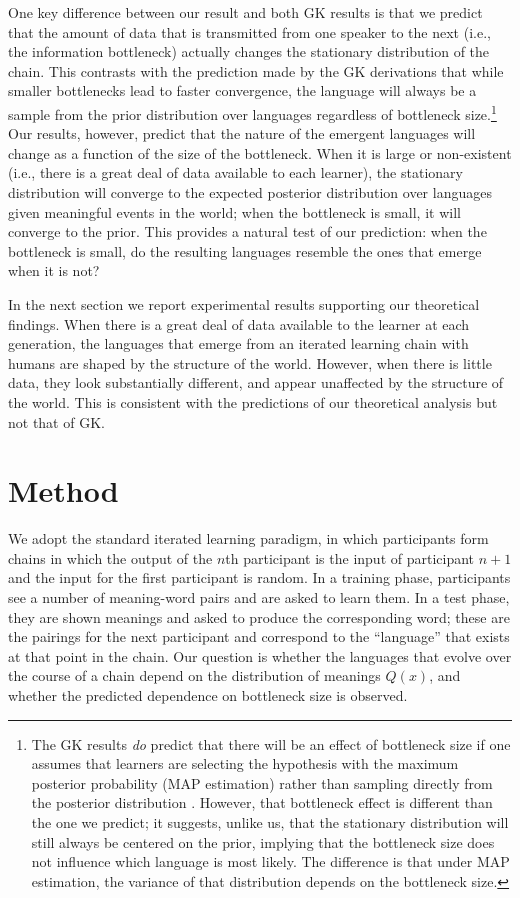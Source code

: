 \documentclass{apa}
\begin{document}
One key difference between our result and both GK results is that we predict that the amount of data that is transmitted from one speaker to the next (i.e., the information bottleneck) actually changes the stationary distribution of the chain. This contrasts with the prediction made by the GK derivations that while smaller bottlenecks lead to faster convergence, the language will always be a sample from the prior distribution over languages regardless of bottleneck size.\footnote{The GK results {\it do} predict that there will be an effect of bottleneck size if one assumes that learners are selecting the hypothesis with the maximum posterior probability (MAP estimation) rather than sampling directly from the posterior distribution \cite{griffithskalish07}. However, that bottleneck effect is different than the one we predict; it suggests, unlike us, that the stationary distribution will still always be centered on the prior, implying that the bottleneck size does not influence which language is most likely. The difference is that under MAP estimation, the variance of that distribution depends on the bottleneck size.} Our results, however, predict that the nature of the emergent languages will change as a function of the size of the bottleneck. When it is large or non-existent (i.e., there is a great deal of data available to each learner), the stationary distribution will converge to the expected posterior distribution over languages given meaningful events in the world; when the bottleneck is small, it will converge to the prior. This provides a natural test of our prediction: when the bottleneck is small, do the resulting languages resemble the ones that emerge when it is not?

In the next section we report experimental results supporting our theoretical findings. When there is a great deal of data available to the learner at each generation, the languages that emerge from an iterated learning chain with humans are shaped by the structure of the world. However, when there is little data, they look substantially different, and appear unaffected by the structure of the world. This is consistent with the predictions of our theoretical analysis but not that of GK.

\section{Method}

We adopt the standard iterated learning paradigm, in which participants form chains in which the output of the $n$th participant is the input of participant $n+1$ and the input for the first participant is random.  In a training phase, participants see a number of meaning-word pairs and are asked to learn them. In a test phase, they are shown meanings and asked to produce the corresponding word; these are the pairings for the next participant and correspond to the ``language'' that exists at that point in the chain. Our question is whether the languages that evolve over the course of a chain depend on the distribution of meanings $Q(x)$, and whether the predicted dependence on bottleneck size is observed.
\end{document}
